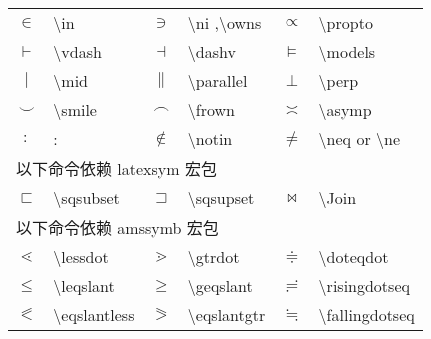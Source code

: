 \documentclass[a4paper]{ctexart}
\begin{document}
\begin{table}
\begin{tabular}{clclcl}
        $\in$           & \textbackslash in         & $\ni$         & \textbackslash ni ,\textbackslash owns    &
        $\propto$       & \textbackslash propto                                                                 \\
        $\vdash$        & \textbackslash vdash      & $\dashv$      & \textbackslash dashv                      &
        $\models$       & \textbackslash models                                                                 \\
        $\mid$          & \textbackslash mid        & $\parallel$   & \textbackslash parallel                   &
        $\perp$         & \textbackslash perp                                                                   \\
        $\smile$        & \textbackslash smile      & $\frown$      & \textbackslash frown                      &
        $\asymp$        & \textbackslash asymp                                                                  \\
        $:$             & :                         & $\notin$      & \textbackslash notin                      &
        $\neq$          & \textbackslash neq or \textbackslash ne                                               \\
        \midrule
        \multicolumn{4}{l}{以下命令依赖 latexsym 宏包}\\
        $\sqsubset$     & \textbackslash sqsubset   & $\sqsupset$   & \textbackslash sqsupset                   & 
        $\Join$         & \textbackslash Join                                                                   \\
        \midrule 
        \multicolumn{4}{l}{以下命令依赖 amssymb 宏包}\\
        $\lessdot$              & \textbackslash lessdot            & $\gtrdot$         & \textbackslash gtrdot         & 
        $\doteqdot$             & \textbackslash doteqdot                                                               \\
        $\leqslant$             & \textbackslash leqslant           & $\geqslant$       & \textbackslash geqslant       &
        $\risingdotseq$         & \textbackslash risingdotseq                                                           \\
        $\eqslantless$          & \textbackslash eqslantless        & $\eqslantgtr$     & \textbackslash eqslantgtr     &
        $\fallingdotseq$        & \textbackslash fallingdotseq                                                          \\

\end{tabular}
\end{table}
\end{document}
